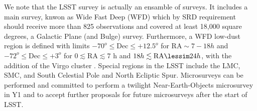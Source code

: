 We note that the LSST survey is actually an ensamble of surveys. It includes a main survey, knwon as Wide Fast Deep (WFD) which by SRD requirement should receive more than 825 observations and covered at least 18,000 square degrees, a Galactic Plane (and Bulge) survey. Furthermore, a WFD low-dust region is defined with limits $-70^o \leq \mathrm{Dec} \leq +12.5^o$ for 
$\mathrm{RA} \sim   7-18 h$ and $-72^o \leq \mathrm{Dec}\leq +3^o$
for $0 \lesssim \mathrm{RA} \lesssim 7$ h and $18 h \lesssim \mathrm{RA} \lessim 24 h$, with the addition of the Virgo cluster .  Special regions in the LSST include the LMC, SMC, and South Celestial Pole and North Ecliptic Spur. Microsurveys can be performed and  committed to perform a twilight Near-Earth-Objects microsurvey in Y1 and to accept further proposals for future microsurveys after the start of LSST.